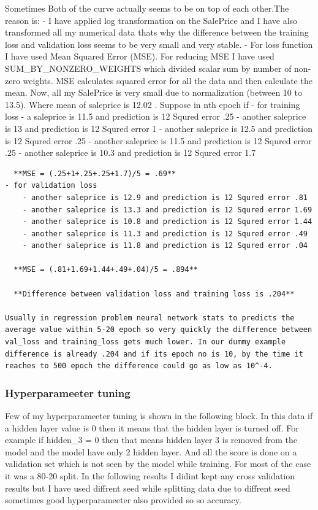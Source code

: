 \documentclass[11pt, a4paper , landscape]{article}
\begin{document}
    Sometimes Both of the curve actually seems to be on top of each
other.The reason is: - I have applied log transformation on the
SalePrice and I have also transformed all my numerical data thats why
the difference between the training loss and validation loss seems to be
very small and very stable. - For loss function I have used Mean Squared
Error (MSE). For reducing MSE I have used SUM\_BY\_NONZERO\_WEIGHTS
which divided scalar sum by number of non-zero weights. MSE calculates
squared error for all the data and then calculate the mean. Now, all my
SalePrice is very small due to normalization (between 10 to 13.5). Where
mean of saleprice is 12.02 . Suppose in nth epoch if - for training loss
- a saleprice is 11.5 and prediction is 12 Squred error .25 - another
saleprice is 13 and prediction is 12 Squred error 1 - another saleprice
is 12.5 and prediction is 12 Squred error .25 - another saleprice is
11.5 and prediction is 12 Squred error .25 - another saleprice is 10.3
and prediction is 12 Squred error 1.7

\begin{verbatim}
  **MSE = (.25+1+.25+.25+1.7)/5 = .69**
- for validation loss
    - another saleprice is 12.9 and prediction is 12 Squred error .81
    - another saleprice is 13.3 and prediction is 12 Squred error 1.69
    - another saleprice is 10.8 and prediction is 12 Squred error 1.44
    - another saleprice is 11.3 and prediction is 12 Squred error .49
    - another saleprice is 11.8 and prediction is 12 Squred error .04
    
  **MSE = (.81+1.69+1.44+.49+.04)/5 = .894**
  
  **Difference between validation loss and training loss is .204**
  
Usually in regression problem neural network stats to predicts the average value within 5-20 epoch so very quickly the difference between val_loss and training_loss gets much lower. In our dummy example difference is already .204 and if its epoch no is 10, by the time it reaches to 500 epoch the difference could go as low as 10^-4.
\end{verbatim}

    \subsubsection{Hyperparameeter tuning}\label{hyperparameeter-tuning}

Few of my hyperparameeter tuning is shown in the following block. In
this data if a hidden layer value is 0 then it means that the hidden
layer is turned off. For example if hidden\_3 = 0 then that means hidden
layer 3 is removed from the model and the model have only 2 hidden
layer. And all the score is done on a validation set which is not seen
by the model while training. For most of the case it was a 80-20 split.
In the following results I didint kept any cross validation results but
I have used diffrent seed while splitting data due to diffrent seed
sometimes good hyperparameeter also provided so so accuracy.
\end{document}
